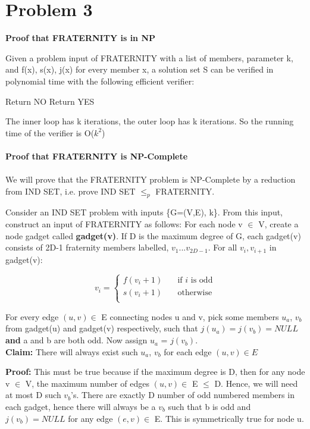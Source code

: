 \section*{Problem 3}

{\bf Proof that FRATERNITY is in NP}

Given a problem input of FRATERNITY with a list of members, parameter
k, and f(x), s(x), j(x) for every member x, a solution set S can be
verified in polynomial time with the following efficient verifier:

\begin{algorithm}[H]
\caption{}
\begin{algorithmic}[1]
\State Return NO
\EndIf
\EndFor
\EndFor
\State Return YES
\end{algorithmic}
\end{algorithm}
The inner loop has k iterations, the outer loop has k
iterations. So the running time of the verifier is O($k^2$)\\
\\
{\bf Proof that FRATERNITY is NP-Complete}\\
\\
We will prove that the FRATERNITY problem is NP-Complete by a
reduction from IND SET, i.e. prove IND SET $\leq_p$ FRATERNITY.

Consider an IND SET problem with inputs \{G=(V,E), k\}. From this input, construct an input of FRATERNITY as follows:
For each node v $\in$ V, create a node gadget called {\bf gadget(v)}. If D is the maximum degree of G, each gadget(v) consists of 2D-1 fraternity members labelled, $v_1$...$v_{2D-1}$. For all $v_i, v_{i+1}$ in gadget(v):

\[
v_i =
    \begin{cases}
        f(v_i+1) &\quad \text{if $i$ is odd} \\
        s(v_i+1) &\quad \text{otherwise} \\
    \end{cases}
\]

For every edge $(u,v) \in$ E connecting nodes u and v, pick some members $u_a$, $v_b$ from gadget(u) and gadget(v) respectively, such that $j(u_a) = j(v_b) = NULL$ \textbf{and} a and b are both odd. Now assign $u_a$ = $j(v_b)$.\\

\textbf{Claim:} There will always exist such $u_a$, $v_b$ for each edge $(u,v) \in E$

\textbf{Proof:} This must be true because if the maximum degree is D, then for any node v $\in$ V, the maximum number of edges $(u,v) \in$ E $\leq$ D. Hence, we will need at most D such $v_b$'s. There are exactly D number of odd numbered members in each gadget, hence there will always be a $v_b$ such that b is odd and $j(v_b) = NULL$ for any edge $(e,v) \in$ E. This is symmetrically true for node u.\\

